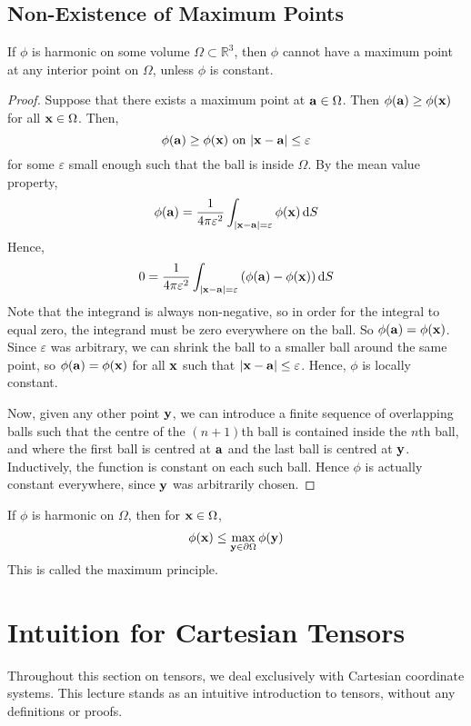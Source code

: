 \documentclass{article}
\begin{document}
\subsection{Non-Existence of Maximum Points}
\begin{proposition}
	If $\phi$ is harmonic on some volume $\Omega \subset \mathbb R^3$, then $\phi$ cannot have a maximum point at any interior point on $\Omega$, unless $\phi$ is constant.
\end{proposition}
\begin{proof}
	Suppose that there exists a maximum point at $\vb a \in \Omega$. Then $\phi(\vb a) \geq \phi(\vb x)$ for all $\vb x \in \Omega$. Then,
	\[ \phi(\vb a) \geq \phi(\vb x) \text{ on } \abs{\vb x - \vb a} \leq \varepsilon \]
	for some $\varepsilon$ small enough such that the ball is inside $\Omega$. By the mean value property,
	\[ \phi(\vb a) = \frac{1}{4\pi \varepsilon^2} \int_{\abs{\vb x - \vb a} = \varepsilon} \phi(\vb x) \dd{S} \]
	Hence,
	\[ 0 = \frac{1}{4\pi \varepsilon^2} \int_{\abs{\vb x - \vb a} = \varepsilon} \left( \phi(\vb a) - \phi(\vb x) \right) \dd{S} \]
	Note that the integrand is always non-negative, so in order for the integral to equal zero, the integrand must be zero everywhere on the ball. So $\phi(\vb a) = \phi(\vb x)$. Since $\varepsilon$ was arbitrary, we can shrink the ball to a smaller ball around the same point, so $\phi(\vb a) = \phi(\vb x)$ for all $\vb x$ such that $\abs{\vb x - \vb a} \leq \varepsilon$. Hence, $\phi$ is locally constant.

	Now, given any other point $\vb y$, we can introduce a finite sequence of overlapping balls such that the centre of the $(n+1)$th ball is contained inside the $n$th ball, and where the first ball is centred at $\vb a$ and the last ball is centred at $\vb y$. Inductively, the function is constant on each such ball. Hence $\phi$ is actually constant everywhere, since $\vb y$ was arbitrarily chosen.
\end{proof}
\begin{corollary}
	If $\phi$ is harmonic on $\Omega$, then for $\vb x \in \Omega$,
	\[ \phi(\vb x) \leq \max_{\vb y \in \partial \Omega} \phi(\vb y) \]
	This is called the maximum principle.
\end{corollary}

\section{Intuition for Cartesian Tensors}
Throughout this section on tensors, we deal exclusively with Cartesian coordinate systems. This lecture stands as an intuitive introduction to tensors, without any definitions or proofs.
\end{document}
